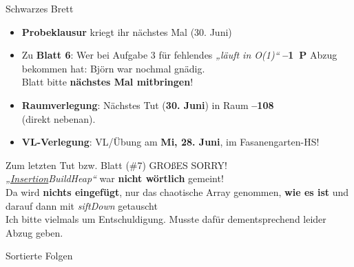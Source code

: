 

\def\haslogo{}



\date{23. Juni \thisyear}



	
	
	\begin{frame}
		\titlepage
	\end{frame}
	
\begin{frame}{Schwarzes Brett}
	\begin{itemize}
		\item \textbf{Probeklausur} kriegt ihr nächstes Mal {\small (30. Juni)}
		\item Zu \textbf{Blatt 6}: Wer bei Aufgabe 3 für fehlendes \textit{„läuft in O(1)“} \textbf{–1~P} Abzug bekommen hat: Björn war nochmal gnädig. \smiley \\
		\impl Blatt bitte \textbf{nächstes Mal mitbringen}! 
		\item \textbf{Raumverlegung}: Nächstes Tut (\textbf{30. Juni}) in Raum \textbf{–108} \\ 
		(direkt nebenan).
		\item \textbf{VL-Verlegung}: VL/Übung am \textbf{Mi, 28. Juni}, im Fasanengarten-HS!
	\end{itemize}
\end{frame}

\begin{frame}{Zum letzten Tut bzw. Blatt (\#7)}
	\Large GROßES SORRY! \frownie \\
	
	\normalsize
	\textit{„\underline{Insertion}BuildHeap“} war \textbf{nicht wörtlich} gemeint! \\
	\impl Da wird \textbf{nichts eingefügt}, nur das chaotische Array genommen, \textbf{wie es ist} und darauf dann mit \textit{siftDown} getauscht \\
	Ich bitte vielmals um Entschuldigung. Musste dafür dementsprechend leider Abzug geben.
\end{frame}
	
\begin{headframe}
	Sortierte Folgen
\end{headframe}

